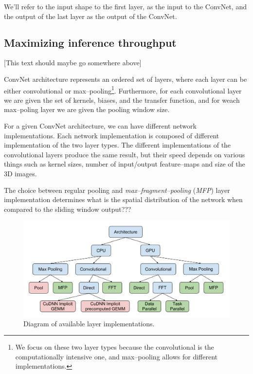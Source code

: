 \documentclass[conference]{IEEEtran}
\begin{document}
  We'll refer to the input shape to the first layer, as the input to
  the ConvNet, and the output of the last layer as the output of the
  ConvNet.

  \subsection{Maximizing inference throughput}

  [This text should maybe go somewhere above]

  ConvNet architecture represents an ordered set of layers, where each
  layer can be either convolutional or max--pooling\footnote{We focus
    on these two layer types because the convolutional is the
    computationally intensive one, and max--pooling allows for
    different implementations.}.  Furthermore, for each convolutional
  layer we are given the set of kernels, biases, and the transfer
  function, and for weach max--poling layer we are given the pooling
  window size.

  For a given ConvNet architecture, we can have different network
  implementations.  Each network implementation is composed of
  different implementation of the two layer types.  The different
  implementations of the convolutional layers produce the same result,
  but their speed depends on various things such as kernel sizes,
  number of input/output feature--maps and size of the 3D images.

  The choice between regular pooling and \emph{max--fragment--pooling}
  (\emph{MFP}) layer implementation determines what is the spatial
  distribution of the network when compared to the sliding window
  output???

  \begin{figure}
    \begin{center}
      \includegraphics[width=0.99\columnwidth]{fig/layers.pdf}
    \end{center}
    \caption{Diagram of available layer implementations.}
    \label{fig:layers}
  \end{figure}
\end{document}
